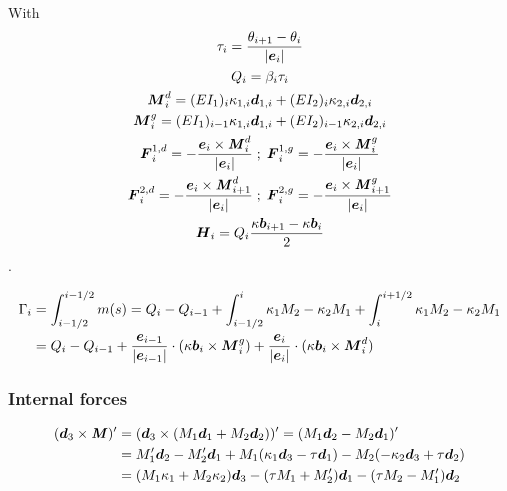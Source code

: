 With
\begin{subequations}
	\begin{gather}
	\tau_i		= \frac{\theta_{i+1} - \theta_i}{|\boldsymbol{e}_i|} \\
	Q_i 			= \beta_i \tau_i \\
	\boldsymbol{M}^{d}_{i} 	= (EI_1)_i \kappa_{1,i} \boldsymbol{d}_{1,i} + (EI_2)_i\kappa_{2,i}\boldsymbol{d}_{2,i} \\ 
	\boldsymbol{M}^{g}_{i} 	= (EI_1)_{i-1} \kappa_{1,i} \boldsymbol{d}_{1,i} + (EI_2)_{i-1}\kappa_{2,i}\boldsymbol{d}_{2,i} \\ 
	\boldsymbol{F}^{1,d}_{i} 	= - \frac{\boldsymbol{e}_i \times \boldsymbol{\mathit{M}}^d_i}{|\boldsymbol{e}_i|} \; ; \; 
	\boldsymbol{F}^{1,g}_{i} 	= - \frac{\boldsymbol{e}_i \times \boldsymbol{\mathit{M}}^g_i}{|\boldsymbol{e}_i|} \\
	\boldsymbol{F}^{2,d}_{i} 	= - \frac{\boldsymbol{e}_i \times \boldsymbol{\mathit{M}}^d_{i+1}}{|\boldsymbol{e}_i|} \; ; \; 
	\boldsymbol{F}^{2,g}_{i} 	= - \frac{\boldsymbol{e}_i \times \boldsymbol{\mathit{M}}^g_{i+1}}{|\boldsymbol{e}_i|} \\
	\boldsymbol{H}_{i} 	= Q_i\frac{\kappa\boldsymbol{b}_{i+1}-\kappa\boldsymbol{b}_i}{2} 
	\end{gather}
\end{subequations}
.


\begin{equation}
	\begin{aligned}
	\Gamma_i 
		&= \int_{i-1/2}^{i-1/2} m(s)  
		= Q_{i} - Q_{i-1}
		+ \int_{i-1/2}^{i} \kappa_{1} M_{2} - \kappa_{2} M_{1}
		+ \int_{i}^{i+1/2} \kappa_{1} M_{2} - \kappa_{2} M_{1}\\
		&= Q_{i} - Q_{i-1}
		+ \frac{\boldsymbol{e}_{i-1}}{|\boldsymbol{e}_{i-1}|} \cdot (\kappa\boldsymbol{b}_i \times \boldsymbol{M}^g_i )
		+ \frac{\boldsymbol{e}_i}{|\boldsymbol{e}_i|} \cdot (\kappa\boldsymbol{b}_i \times \boldsymbol{M}^d_i )
	\end{aligned}
\end{equation}

\subsubsection{Internal forces}


\begin{equation}
	\begin{aligned}
	 (\boldsymbol{d}_3 \times \boldsymbol{\mathit{M}})' 
	 &= (\boldsymbol{d}_3 \times (M_1 \boldsymbol{d}_1 + M_2 \boldsymbol{d}_2))' 
	 = (M_1 \boldsymbol{d}_2 - M_2 \boldsymbol{d}_1 )' \\
	 &= M_1' \boldsymbol{d}_2 - M_2' \boldsymbol{d}_1 
	 + M_1 (\kappa_{1}\boldsymbol{d}_3 - \tau\boldsymbol{d}_1)
	 - M_2(-\kappa_{2}\boldsymbol{d}_3 + \tau\boldsymbol{d}_2) \\
	 &= (M_1\kappa_1 + M_2\kappa_2)\boldsymbol{d}_3 - (\tau M_1 + M_2')\boldsymbol{d}_1 - (\tau M_2 - M_1')\boldsymbol{d}_2  
	 \end{aligned}
\end{equation}

